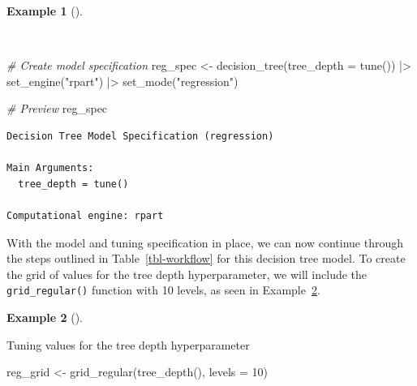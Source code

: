 \documentclass[
  letterpaper,
  krantz1]{latex/krantz-mod}
\newenvironment{Shaded}{\begin{snugshade}}{\end{snugshade}}
\newcommand{\AttributeTok}[1]{\textcolor[rgb]{0.00,0.00,0.00}{#1}}
\newcommand{\CommentTok}[1]{\textcolor[rgb]{0.00,0.00,0.00}{\textit{#1}}}
\newcommand{\DecValTok}[1]{\textcolor[rgb]{0.00,0.00,0.00}{#1}}
\newcommand{\FunctionTok}[1]{\textcolor[rgb]{0.00,0.00,0.00}{#1}}
\newcommand{\NormalTok}[1]{\textcolor[rgb]{0.00,0.00,0.00}{#1}}
\newcommand{\OtherTok}[1]{\textcolor[rgb]{0.00,0.00,0.00}{#1}}
\newcommand{\SpecialCharTok}[1]{\textcolor[rgb]{0.00,0.00,0.00}{#1}}
\newcommand{\StringTok}[1]{\textcolor[rgb]{0.00,0.00,0.00}{#1}}
\theoremstyle{definition}
\newtheorem{example}{Example}[chapter]
\theoremstyle{definition}
\theoremstyle{remark}
\begin{document}
\begin{example}[]\protect\hypertarget{exm-predict-reg-model-spec-decision-tree}{}\label{exm-predict-reg-model-spec-decision-tree}

~

\begin{Shaded}
\begin{Highlighting}[numbers=left,,]
\CommentTok{\# Create model specification}
\NormalTok{reg\_spec }\OtherTok{\textless{}{-}}
  \FunctionTok{decision\_tree}\NormalTok{(}\AttributeTok{tree\_depth =} \FunctionTok{tune}\NormalTok{()) }\SpecialCharTok{|\textgreater{}}
  \FunctionTok{set\_engine}\NormalTok{(}\StringTok{"rpart"}\NormalTok{) }\SpecialCharTok{|\textgreater{}}
  \FunctionTok{set\_mode}\NormalTok{(}\StringTok{"regression"}\NormalTok{)}

\CommentTok{\# Preview}
\NormalTok{reg\_spec}
\end{Highlighting}
\end{Shaded}

\begin{verbatim}
Decision Tree Model Specification (regression)

Main Arguments:
  tree_depth = tune()

Computational engine: rpart
\end{verbatim}

\end{example}

With the model and tuning specification in place, we can now continue
through the steps outlined in Table~\ref{tbl-workflow} for this decision
tree model. To create the grid of values for the tree depth
hyperparameter, we will include the \texttt{grid\_regular()} function
with 10 levels, as seen in
Example~\ref{exm-predict-reg-decision-tree-depth}.

\begin{example}[]\protect\hypertarget{exm-predict-reg-decision-tree-depth}{}\label{exm-predict-reg-decision-tree-depth}

Tuning values for the tree depth hyperparameter

\begin{Shaded}
\begin{Highlighting}[numbers=left,,]
\NormalTok{reg\_grid }\OtherTok{\textless{}{-}}
  \FunctionTok{grid\_regular}\NormalTok{(}\FunctionTok{tree\_depth}\NormalTok{(), }\AttributeTok{levels =} \DecValTok{10}\NormalTok{)}
\end{Highlighting}
\end{Shaded}

\end{example}
\end{document}
